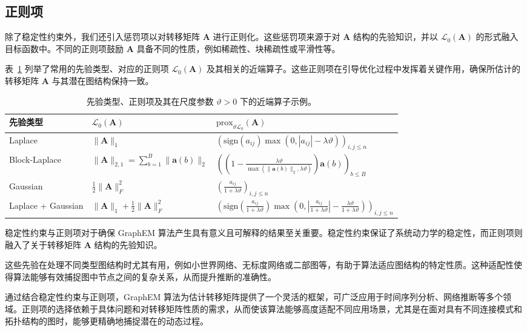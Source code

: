 \subsection{正则项}

除了稳定性约束外，我们还引入惩罚项以对转移矩阵 \(\mathbf{A}\) 进行正则化。这些惩罚项来源于对 \(\mathbf{A}\) 结构的先验知识，并以 \(\mathcal{L}_0(\mathbf{A})\) 的形式融入目标函数中。不同的正则项鼓励 \(\mathbf{A}\) 具备不同的性质，例如稀疏性、块稀疏性或平滑性等。

表~\ref{tab: reg prox table} 列举了常用的先验类型、对应的正则项 \(\mathcal{L}_0(\mathbf{A})\) 及其相关的近端算子。这些正则项在引导优化过程中发挥着关键作用，确保所估计的转移矩阵 \(\mathbf{A}\) 与其潜在图结构保持一致。

\begin{table}[tb]
    \centering
    \caption{先验类型、正则项及其在尺度参数 \(\vartheta > 0\) 下的近端算子示例。}
    \label{tab: reg prox table}
    \begin{tabular}{@{}p{1.8cm}p{4.1cm}p{8cm}@{}}
        \toprule
        \textbf{先验类型} & \textbf{\(\mathcal{L}_0(\mathbf{A})\)} & \textbf{\(\text{prox}_{\vartheta \mathcal{L}_0}(\mathbf{A})\)} \\ 
        \midrule
        Laplace & \(\|\mathbf{A}\|_1\) & \(\left(\text{sign}(a_{ij}) \max(0, |a_{ij}| - \lambda\vartheta)\right)_{i, j \le n}\) \\ 
        \addlinespace
        Block-Laplace & \(\|\mathbf{A}\|_{2, 1} = \sum_{b=1}^B \|\mathbf{a}(b)\|_2\) & \(\left(\left(1 - \frac{\lambda\vartheta}{\max(\|\mathbf{a}(b)\|_2, \lambda\vartheta)}\right)\mathbf{a}(b)\right)_{b \le B}\) \\ 
        \addlinespace
        Gaussian & \(\frac{1}{2} \|\mathbf{A}\|_F^2\) & \(\left(\frac{a_{ij}}{1+\lambda\vartheta}\right)_{i, j \le n}\) \\ 
        \addlinespace
        Laplace + Gaussian & \(\|\mathbf{A}\|_1 + \frac{1}{2} \|\mathbf{A}\|_F^2\) & \(\left(\text{sign}\left(\frac{a_{ij}}{1+\lambda\vartheta}\right) \max\left(0, |\frac{a_{ij}}{1+\lambda\vartheta}| - \frac{\lambda\vartheta}{1+\lambda\vartheta}\right)\right)_{i, j \le n}\) \\ 
        \bottomrule
    \end{tabular}
\end{table}

稳定性约束与正则项对于确保 GraphEM 算法产生具有意义且可解释的结果至关重要。稳定性约束保证了系统动力学的稳定性，而正则项则融入了关于转移矩阵 \(\mathbf{A}\) 结构的先验知识。

这些先验在处理不同类型图结构时尤其有用，例如小世界网络、无标度网络或二部图等，有助于算法适应图结构的特定性质。这种适配性使得算法能够有效捕捉图中节点之间的复杂关系，从而提升推断的准确性。

通过结合稳定性约束与正则项，GraphEM 算法为估计转移矩阵提供了一个灵活的框架，可广泛应用于时间序列分析、网络推断等多个领域。正则项的选择依赖于具体问题和对转移矩阵性质的需求，从而使该算法能够高度适配不同应用场景，尤其是在面对具有不同连接模式和拓扑结构的图时，能够更精确地捕捉潜在的动态过程。

